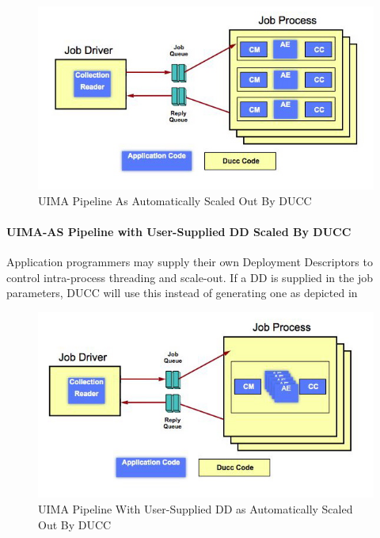     \begin{figure}[H]
      \centering
      \includegraphics[bb=0 0 571 311, width=5.5in]{images/ducc-sequential.jpg}
      \caption{UIMA Pipeline As Automatically Scaled Out By DUCC}
      \label{fig:UIMA-AS-pipeline-DUCC}
    \end{figure}

    \paragraph{UIMA-AS Pipeline with User-Supplied DD Scaled By DUCC}

    Application programmers may supply their own Deployment Descriptors to control intra-process
    threading and scale-out.  If a DD is supplied in the job parameters, DUCC will use this instead
    of generating one as depicted in 

    \begin{figure}[H]
      \centering
      \includegraphics[bb=0 0 571 316,width=5.5in]{images/ducc-parallel.jpg}
      \caption{UIMA Pipeline With User-Supplied DD as Automatically Scaled Out By DUCC}
      \label{fig:UIMA-AS-pipeline-DUCC-DD}
    \end{figure}

